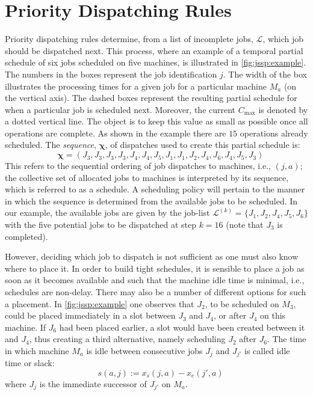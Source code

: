 \documentclass[twocolumn]{svjour3}
\newcommand{\vchi}{\bm \chi}
\newcommand{\dr}{dispatching rule}
\begin{document}
\section{Priority Dispatching Rules} \label{sec:DR}

Priority \dr s determine, from a list of incomplete jobs, 
$\mathcal{L}$, which job should be dispatched next. This process, where an 
example of 
a temporal partial schedule of six jobs scheduled on five machines, is 
illustrated in \cref{fig:jssp:example}.
The numbers in the boxes represent the job identification $j$. 
The width of the box illustrates the processing times for a given job for a 
particular machine $M_a$ (on the vertical axis). 
The dashed boxes represent the resulting partial schedule for when a particular 
job is scheduled next. 
Moreover, the current $C_{\max}$ is denoted by a dotted vertical line. 
The object is to keep this value as small as possible once all operations are 
complete. As shown in the example there are $15$ operations already scheduled. 
The \textit{sequence}, $\vchi$, of dispatches used to create this partial 
schedule is:
\begin{equation}\quad
\vchi=\left(J_3,J_3,J_3,J_3,J_4,J_4,J_5,J_1,J_1,J_2,J_4,J_6,J_4,J_5,J_3\right)
\end{equation}
This refers to the sequential ordering of job dispatches to machines, i.e., 
$(j,a)$; 
the collective set of allocated jobs to machines is interpreted by its 
sequence, which is referred to as a schedule.
A scheduling policy will pertain to the manner in which 
the sequence is determined from the available jobs to be scheduled. 
In our example, the available jobs are given by the job-list
$\mathcal{L}^{(k)}=\{J_1,J_2,J_4,J_5,J_6\}$ with the five potential jobs 
to be dispatched at step $k=16$ (note that $J_3$ is completed).

However, deciding which job to dispatch is not sufficient as one must also know 
where to place it. In order to build tight schedules, it is sensible to place a 
job as soon as it becomes available and such that the machine idle time is 
minimal, i.e., schedules are non-delay. 
There may also be a number of different options for such a placement. 
In \cref{fig:jssp:example} one observes that $J_2$, to be scheduled on $M_3$, 
could be placed immediately in a slot between $J_3$ and $J_4$, or after $J_4$ 
on this machine. 
If $J_6$ had been placed earlier, a slot would have been created between it and 
$J_4$, thus creating a third alternative, namely scheduling $J_2$ after $J_6$. 
The time in which machine $M_a$ is idle between consecutive jobs $J_j$ and 
$J_{j'}$ is called idle time or slack:
\begin{equation}\quad 
s(a,j):=x_s(j,a)-x_e(j',a) \label{eq:slack}
\end{equation}
where $J_j$ is the immediate successor of $J_{j'}$ on $M_a$. 
\end{document}
